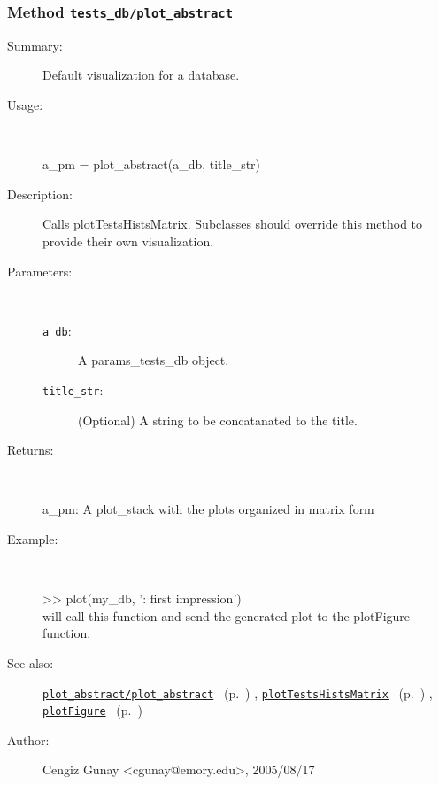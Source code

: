 \subsubsection[Method \texttt{plot\_abstract}]{Method \texttt{tests\_db/plot\_abstract}}%
%
\label{ref_tests_db__plot_abstract}%
\hypertarget{ref_tests_db__plot_abstract}{}%
\begin{description}
\item[Summary:]Default visualization for a database.
%
\item[Usage:]~%
\begin{lyxcode}%
a\_pm = plot\_abstract(a\_db, title\_str)
%
\end{lyxcode}%
%
\item[Description:]%
Calls plotTestsHistsMatrix. Subclasses should override this method
 to provide their own visualization.
\item[Parameters:]~
\begin{description}%
\item[\texttt{a\_db}:]
 A params\_tests\_db object.
\item[\texttt{title\_str}:]
 (Optional) A string to be concatanated to the title.
\end{description}%
%
\item[Returns:]~

	a\_pm: A plot\_stack with the plots organized in matrix form
%
\item[Example:]~
\begin{lyxcode}   >> plot(my\_db, ': first impression')\\%
 will call this function and send the generated plot to the plotFigure function.\\%
\end{lyxcode}
%
\item[See also:]%
\hyperlink{ref_plot_abstract__plot_abstract}{\texttt{plot\_abstract/plot\_abstract}}%
\ (p.~\pageref{ref_plot_abstract__plot_abstract})%
%
, \hyperlink{ref_plotTestsHistsMatrix}{\texttt{plotTestsHistsMatrix}}%
\ (p.~\pageref{ref_plotTestsHistsMatrix})%
%
, \hyperlink{ref_plotFigure}{\texttt{plotFigure}}%
\ (p.~\pageref{ref_plotFigure})%
%
%
\item[Author:]%
Cengiz Gunay <cgunay@emory.edu>, 2005/08/17%
\end{description}
\methodline%
